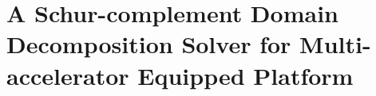 \chapter{A Schur-complement Domain Decomposition Solver for Multi-accelerator Equipped Platform} \label{Chapter:DD}





